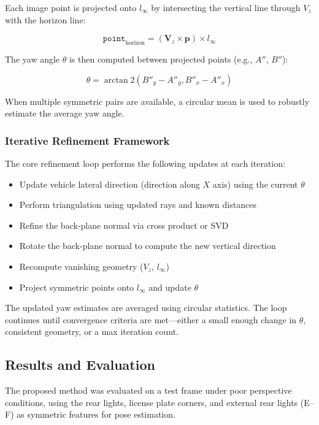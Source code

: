 Each image point is projected onto $l_\infty$ by intersecting the vertical line through $V_z$ with the horizon line:

\begin{equation}
    \texttt{point}_{\text{horizon}} = (\mathbf{V}_z \times \mathbf{p}) \times l_\infty
\end{equation}

The yaw angle $\theta$ is then computed between projected points (e.g., $A''$, $B''$):

\begin{equation}
    \theta = \arctan2( B''_y - A''_y, B''_x - A''_x )
\end{equation}

When multiple symmetric pairs are available, a circular mean is used to robustly estimate the average yaw angle.

\subsubsection{Iterative Refinement Framework}
The core refinement loop performs the following updates at each iteration:

\begin{itemize}
    \item Update vehicle lateral direction (direction along $X$ axis) using the current $\theta$
    \item Perform triangulation using updated rays and known distances
    \item Refine the back-plane normal via cross product or SVD
    \item Rotate the back-plane normal to compute the new vertical direction
    \item Recompute vanishing geometry ($V_z$, $l_\infty$)
    \item Project symmetric points onto $l_\infty$ and update $\theta$
\end{itemize}

The updated yaw estimates are averaged using circular statistics. The loop continues until convergence criteria are met—either a small enough change in $\theta$, consistent geometry, or a max iteration count.

\subsection{Results and Evaluation}
The proposed method was evaluated on a test frame under poor perspective conditions, using the rear lights, license plate corners, and external rear lights (E–F) as symmetric features for pose estimation.

